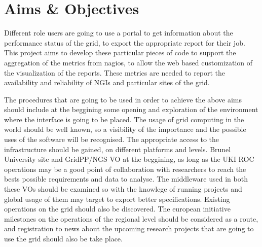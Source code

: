 \section{Aims \& Objectives}

Different role users are going to use a portal to get information about the
performance status of the grid, to export the appropriate report for their job.
This project aims to develop these particular pieces of code to support the 
aggregation of the metrics from nagios, to allow the web based customization of
the visualization of the reports. These metrics are needed to report the
availability and reliability of NGIs and particular sites of the grid.

The procedures that are going to be used in order to achieve the above aims
should include at the beggining some opening and exploration of the environment
where the interface is going to be placed. The usage of grid computing in
the world should be well known, so a visibility of the importance and the
possible uses of the software will be recognised. The appropriate
access to the infrastructure should be gained, on different platforms and levels.
Brunel University site and GridPP/NGS VO at the beggining, as long as the UKI
ROC operations may be a good point of collaboration with researchers to reach
the bests possible requirements and data to analyse. The middleware used in
both these VOs should be examined so with the knowlege of running projects and
global usage of them may target to export better specifications. Existing
operations on the grid should also be discovered. The european initiative
milestones on the operations of the regional level should be considered as a
route, and registration to news about the upcoming research projects that
are going to use the grid should also be take place.



